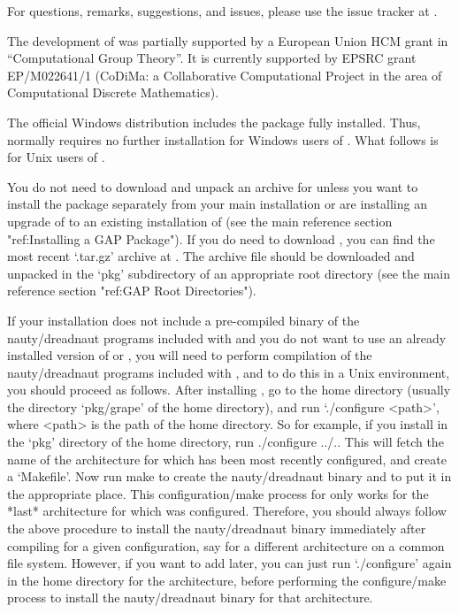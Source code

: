 For questions, remarks, suggestions, and issues, please use the issue
tracker at .

The development of {\GRAPE} was partially supported by a European
Union HCM grant in ``Computational Group Theory''. It is currently
supported by EPSRC grant EP/M022641/1 (CoDiMa: a Collaborative
Computational Project in the area of Computational Discrete Mathematics).


The official {\GAP} Windows distribution includes the {\GRAPE} package
fully installed.  Thus, {\GRAPE} normally requires no further installation
for Windows users of {\GAP}. What follows is for Unix users of {\GRAPE}.

You do not need to download and unpack an archive for {\GRAPE} unless you
want to install the package separately from your main {\GAP} installation
or are installing an upgrade of {\GRAPE} to an existing installation
of {\GAP} (see the main {\GAP} reference section "ref:Installing a GAP
Package").  If you do need to download {\GRAPE}, you can find the most
recent `.tar.gz' archive at .
The archive file should be downloaded and unpacked in the `pkg'
subdirectory of an appropriate {\GAP} root directory (see the main {\GAP}
reference section "ref:GAP Root Directories").

If your {\GRAPE} installation does not include a pre-compiled binary of 
the nauty/dreadnaut programs included with {\GRAPE} and you do not want 
to use an already installed version of {\nauty} or {\bliss}, you will 
need to perform compilation of the nauty/dreadnaut programs included with
{\GRAPE}, and to do this in a Unix environment, you should proceed as
follows.  After installing {\GAP}, go to the {\GRAPE} home directory
(usually the directory `pkg/grape' of the {\GAP} home directory),
and run `./configure <path>', where <path> is the path of the {\GAP}
home directory.  So for example, if you install {\GRAPE} in the `pkg'
directory of the {\GAP} home directory, run 
\begintt 
./configure ../..
\endtt 
This will fetch the name of the architecture for which {\GAP}
has been most recently configured, and create a `Makefile'. Now run
\begintt 
make 
\endtt 
to create the nauty/dreadnaut binary and to put
it in the appropriate place.  This configuration/make process for
{\GRAPE} only works for the *last* architecture for which {\GAP} was
configured. Therefore, you should always follow the above procedure to
install the nauty/dreadnaut binary immediately after compiling {\GAP}
for a given configuration, say for a different architecture on a common
file system. However, if you want to add {\GRAPE} later, you can just run
`./configure' again in the {\GAP} home directory for the architecture,
before performing the {\GRAPE} configure/make process to install the
nauty/dreadnaut binary for that architecture.

